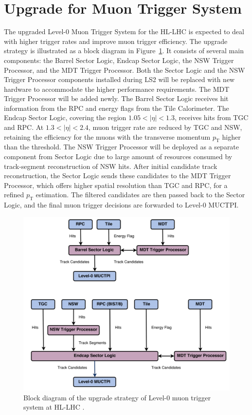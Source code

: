 \section{Upgrade for Muon Trigger System} \label{sec:MuonTriggerUpgrade}
The upgraded Level-0 Muon Trigger System for the HL-LHC is expected to deal with higher trigger rates and improve muon trigger efficiency. The upgrade strategy is illustrated as a block diagram in Figure~\ref{fig:muon_trigger_upgrade}. It consists of several main components: the Barrel Sector Logic, Endcap Sector Logic, the NSW Trigger Processor, and the MDT Trigger Processor. Both the Sector Logic and the NSW Trigger Processor components installed during LS2 will be replaced with new hardware to accommodate the higher performance requirements. The MDT Trigger Processor will be added newly. The Barrel Sector Logic receives hit information from the RPC and energy flags from the Tile Calorimeter. The Endcap Sector Logic, covering the region $1.05 < |\eta| < 1.3$, receives hits from TGC and RPC. At $1.3 < |\eta| < 2.4$, muon trigger rate are reduced by TGC and NSW, retaining the efficiency for the muons with the transverse momentum $p_\mathrm{T}$ higher than the threshold. The NSW Trigger Processor will be deployed as a separate component from Sector Logic due to large amount of resources consumed by track-segment reconstruction of NSW hits. After initial candidate track reconstruction, the Sector Logic sends these candidates to the MDT Trigger Processor, which offers higher spatial resolution than TGC and RPC, for a refined $p_\mathrm{T}$ estimation. The filtered candidates are then passed back to the Sector Logic, and the final muon trigger decisions are forwarded to Level-0 MUCTPI.

\begin{figure}[htbp]
  \centering
  \includegraphics[width=1.0\textwidth]{figs/chapter2/muon_trigger_upgrade.png}
  \caption{Block diagram of the upgrade strategy of Level-0 muon trigger system at HL-LHC \cite{TDAQ_TDR}.}
  \label{fig:muon_trigger_upgrade}
\end{figure}
